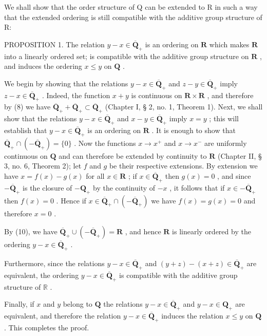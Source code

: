 We shall show that the order structure of Q can be extended to R in such a way that the extended ordering is still compatible with the additive group structure of R:

PROPOSITION 1. The relation \(y - x \in \overline{\mathbf{Q}}_+\) is an ordering on \(\mathbf{R}\) which makes \(\mathbf{R}\) into a linearly ordered set; is compatible with the additive group structure on \(\mathbf{R}\) , and induces the ordering \(x \leqslant y\) on \(\mathbf{Q}\) .

We begin by showing that the relations \(y - x \in \overline{\mathbf{Q}}_+\) and \(z - y \in \overline{\mathbf{Q}}_+\) imply \(z - x \in \overline{\mathbf{Q}}_+\) . Indeed, the function \(x + y\) is continuous on \(\mathbf{R} \times \mathbf{R}\) , and therefore by (8) we have \(\overline{\mathbf{Q}}_+ + \overline{\mathbf{Q}}_+ \subset \overline{\mathbf{Q}}_+\) (Chapter I, § 2, no. 1, Theorem 1). Next, we shall show that the relations \(y - x \in \overline{\mathbf{Q}}_+\) and \(x - y \in \overline{\mathbf{Q}}_+\) imply \(x = y\) ; this will establish that \(y - x \in \overline{\mathbf{Q}}_+\) is an ordering on \(\mathbf{R}\) . It is enough to show that \(\overline{\mathbf{Q}}_+ \cap (-\overline{\mathbf{Q}}_+) = \{0\}\) . Now the functions \(x \to x^+\) and \(x \to x^-\) are uniformly continuous on \(\mathbf{Q}\) and can therefore be extended by continuity to \(\mathbf{R}\) (Chapter II, § 3, no. 6, Theorem 2); let \(f\) and \(g\) be their respective extensions. By extension we have \(x = f(x) - g(x)\) for all \(x \in \mathbf{R}\) ; if \(x \in \overline{\mathbf{Q}}_+\) then \(g(x) = 0\) , and since \(-\overline{\mathbf{Q}}_+\) is the closure of \(-\mathbf{Q}_+\) by the continuity of \(-x\) , it follows that if \(x \in -\overline{\mathbf{Q}}_+\) then \(f(x) = 0\) . Hence if \(x \in \overline{\mathbf{Q}}_+ \cap (-\overline{\mathbf{Q}}_+)\) we have \(f(x) = g(x) = 0\) and therefore \(x = 0\) .

By (10), we have \(\overline{\mathbf{Q}}_{+} \cup (-\overline{\mathbf{Q}}_{+}) = \mathbf{R}\) , and hence \(\mathbf{R}\) is linearly ordered by the ordering \(y - x \in \overline{\mathbf{Q}}_{+}\) .

Furthermore, since the relations \(y - x \in \overline{\mathbf{Q}}_+\) and \((y + z) - (x + z) \in \overline{\mathbf{Q}}_+\) are equivalent, the ordering \(y - x \in \overline{\mathbf{Q}}_+\) is compatible with the additive group structure of \(\mathbb{R}\) .

Finally, if \(x\) and \(y\) belong to \(\mathbf{Q}\) the relations \(y - x \in \overline{\mathbf{Q}}_+\) and \(y - x \in \mathbf{Q}_+\) are equivalent, and therefore the relation \(y - x \in \overline{\mathbf{Q}}_+\) induces the relation \(x \leqslant y\) on \(\mathbf{Q}\) . This completes the proof.

